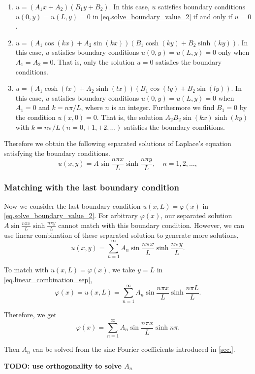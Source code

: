 \begin{enumerate}
    \item $u=\left(A_1 x+A_2\right)\left(B_1 y+B_2\right)$. In this case, $u$ satisfies boundary conditions $u(0, y)=u(L, y)=0$ in \eqref{eq.solve_boundary_value_2} if and only if $u = 0$.
    \item $u = \left(A_1 \cos (k x)+A_2 \sin (k x)\right)\left(B_1 \cosh (k y)+B_2 \sinh (k y)\right)$. In this case, $u$ satisfies boundary conditions $u(0, y)=u(L, y)=0$ only when $A_1=A_2=0$. That is, only the solution $u=0$ satisfies the boundary conditions.
    \item $u = \left(A_1 \cosh (l x)+A_2 \sinh (l x)\right)\left(B_1 \cos (l y)+B_2 \sin (l y)\right)$. In this case, $u$ satisfies boundary conditions $u(0, y)=u(L, y)=0$ when $A_1=0$ and $k=n \pi / L$, where $n$ is an integer. Furthermore we find $B_1=0$ by the condition $u(x, 0)=0$. That is, the solution $A_2 B_2 \sin (k x) \sinh (k y)$ with $k=n \pi / L(n=0, \pm 1, \pm 2, \ldots)$ satisfies the boundary conditions.
\end{enumerate}

Therefore we obtain the following separated solutions of Laplace's equation satisfying the boundary conditions.
\begin{equation}
u(x, y)=A \sin \frac{n \pi x}{L} \sinh \frac{n \pi y}{L}, \quad n=1,2, \ldots,
\end{equation}

\subsubsection{Matching with the last boundary condition}

Now we consider the last boundary condition $u(x, L)=\varphi(x)$ in \eqref{eq.solve_boundary_value_2}. For arbitrary $\varphi(x)$, our separated solution $A \sin \frac{n \pi x}{L} \sinh \frac{n \pi y}{L}$ cannot match with this boundary condition. However, we can use linear combination of these separated solution to generate more solutions,
\begin{equation}\label{eq.linear_combination_sep}
u(x, y)=\sum_{n = 1}^{\infty} A_n \sin \frac{n \pi x}{L} \sinh \frac{n \pi y}{L}.
\end{equation}

To match with $u(x, L)=\varphi(x)$, we take $y = L$ in \eqref{eq.linear_combination_sep},
\begin{equation}\label{eq.match_boundary}
\varphi(x) = u(x, L)=\sum_{n = 1}^{\infty} A_n \sin \frac{n \pi x}{L} \sinh \frac{n \pi L}{L}.
\end{equation}

Therefore, we get 
\begin{equation}\label{eq.match_boundary_1}
\varphi(x) =\sum_{n = 1}^{\infty} A_n \sin \frac{n \pi x}{L} \sinh n \pi.
\end{equation}

Then $A_n$ can be solved from the sine Fourier coefficients introduced in \ref{sec.}.

\textbf{TODO: use orthogonality to solve $A_n$}
